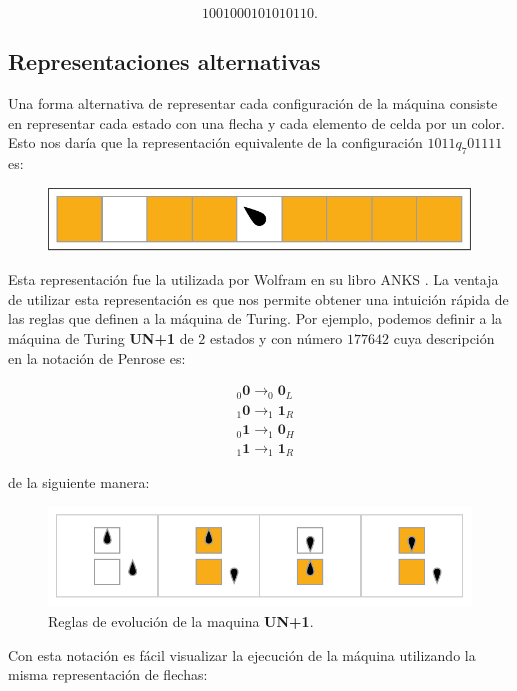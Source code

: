 \documentclass[10pt,a4paper]{article}
\begin{document}
\[
	1001000101010110.
\]

\subsection{Representaciones alternativas}
Una forma alternativa de representar cada configuración de la máquina consiste en representar cada estado con una flecha y cada elemento de celda por un color. Esto nos daría que la representación equivalente de la configuración $1011q_7 01111$ es:
\begin{figure}[h!tb!]
	\centering
	\includegraphics[scale=0.38]{../img/example_initial.pdf}
\end{figure}

Esta representación fue la utilizada por Wolfram en su libro ANKS \cite{Wolfram2002}. La ventaja de utilizar esta representación es que nos permite obtener una intuición rápida de las reglas que definen a la máquina de Turing. Por ejemplo, podemos definir a la máquina de Turing \textbf{UN+1} de $2$ estados y con número $177642$ cuya descripción en la notación de Penrose es:

\begin{align*}
	&_{0}\textbf{0} \rightarrow _{0}\textbf{0}_L \\
	&_{1}\textbf{0} \rightarrow _{1}\textbf{1}_R \\
	&_{0}\textbf{1} \rightarrow _{1}\textbf{0}_H \\
	&_{1}\textbf{1} \rightarrow _{1}\textbf{1}_R
\end{align*}

de la siguiente manera:
\begin{figure}[h!tb!]
	\centering
	\includegraphics[scale=0.68]{../img/example_rules.pdf}
	\caption{Reglas de evolución de la maquina \textbf{UN+1}.}
	\label{fig:un1rules}
\end{figure}

Con esta notación es fácil visualizar la ejecución de la máquina utilizando la misma representación de flechas:
\end{document}
